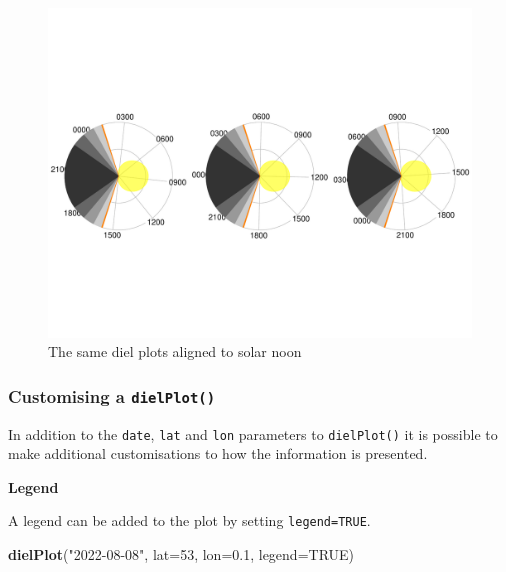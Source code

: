 \documentclass[
]{book}
\newenvironment{Shaded}{\begin{snugshade}}{\end{snugshade}}
\newcommand{\AttributeTok}[1]{\textcolor[rgb]{0.13,0.29,0.53}{#1}}
\newcommand{\ConstantTok}[1]{\textcolor[rgb]{0.56,0.35,0.01}{#1}}
\newcommand{\DecValTok}[1]{\textcolor[rgb]{0.00,0.00,0.81}{#1}}
\newcommand{\FloatTok}[1]{\textcolor[rgb]{0.00,0.00,0.81}{#1}}
\newcommand{\FunctionTok}[1]{\textcolor[rgb]{0.13,0.29,0.53}{\textbf{#1}}}
\newcommand{\NormalTok}[1]{#1}
\newcommand{\StringTok}[1]{\textcolor[rgb]{0.31,0.60,0.02}{#1}}
\begin{document}
\begin{figure}

{\centering \includegraphics[width=0.9\linewidth]{_main_files/figure-latex/diel-plot-sn-1} 

}

\caption{The same diel plots aligned to solar noon}\label{fig:diel-plot-sn}
\end{figure}

\hypertarget{customising-a-dielplot}{%
\subsubsection{\texorpdfstring{Customising a \texttt{dielPlot()}}{Customising a dielPlot()}}\label{customising-a-dielplot}}

In addition to the \texttt{date}, \texttt{lat} and \texttt{lon} parameters to \texttt{dielPlot()} it is possible to make additional customisations to how the information is presented.

\textbf{Legend}

A legend can be added to the plot by setting \texttt{legend=TRUE}.

\begin{Shaded}
\begin{Highlighting}[]
\FunctionTok{dielPlot}\NormalTok{(}\StringTok{"2022{-}08{-}08"}\NormalTok{, }\AttributeTok{lat=}\DecValTok{53}\NormalTok{, }\AttributeTok{lon=}\FloatTok{0.1}\NormalTok{, }\AttributeTok{legend=}\ConstantTok{TRUE}\NormalTok{)}
\end{Highlighting}
\end{Shaded}
\end{document}
